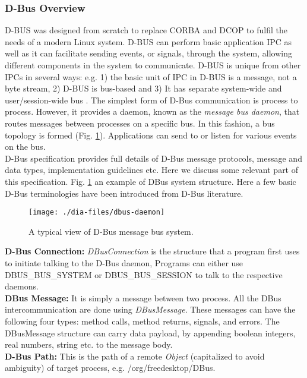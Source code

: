 \subsubsection*{D-Bus Overview}
D-BUS was designed from scratch to replace CORBA and DCOP to fulfil the needs of a modern Linux system. D-BUS can perform basic application IPC as well as it can facilitate sending events, or signals, through the system, allowing different components in the system to communicate. D-BUS is unique from other IPCs in several ways: e.g. 1) the basic unit of IPC in D-BUS is a message, not a byte stream, 2) D-BUS is bus-based and 3) It has separate system-wide and user/session-wide bus \cite{Love2005}. The simplest form of D-Bus communication is process to process. However, it provides a daemon, known as the {\em message bus daemon}, that routes messages between processes on a specific bus. In this fashion, a bus topology is formed (Fig. \ref{fig:dbus-daemon}). Applications can send to or listen for various events on the bus.\\
D-Bus specification \cite{Pennington+2010} provides full details of D-Bus message protocols, message and data types, implementation guidelines etc. Here we discuss some relevant part of this specification. Fig. \ref{fig:dbus-daemon} an example of DBus system structure.
Here a few basic D-Bus terminologies have been introduced from D-Bus literature.\\ 
\begin{figure}
\begin{center}
\texttt{[image: ./dia-files/dbus-daemon]} 
\caption{A typical view of D-Bus message bus system. } 
\label{fig:dbus-daemon}
\end{center}
\end{figure}
\textbf{D-Bus Connection: }
\textit{DBusConnection} is the structure that a program first uses to initiate talking to the D-Bus daemon, Programs can either use DBUS\_BUS\_SYSTEM or DBUS\_BUS\_SESSION to talk to the respective daemons.\\
\textbf{DBus Message: }
It is simply a message between two process. All the DBus intercommunication are done using \textit{DBusMessage}. These messages can have the following four types: method calls, method returns, signals, and errors. The DBusMessage structure can carry data payload, by appending boolean integers, real numbers, string etc. to the message body.\\ 
\textbf{D-Bus Path: }
This is the path of a remote \textit{Object} (capitalized to avoid ambiguity) of target process, e.g. /org/freedesktop/DBus.\\
